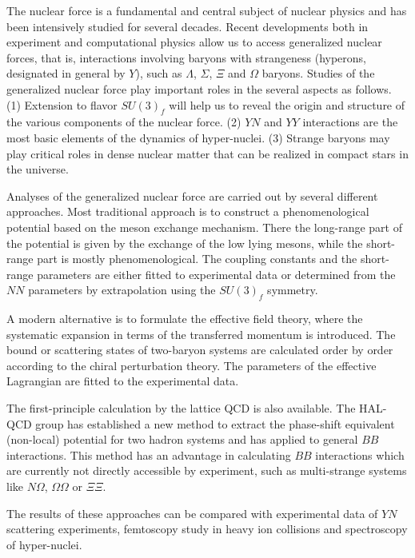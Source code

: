\documentclass[aps,prd,showpacs,floatfix,reprint,nofootinbib]{revtex4-1}
\begin{document}
The nuclear force is a fundamental and central subject of nuclear physics and has been intensively studied for several decades.
Recent developments both in experiment and computational physics allow us to access generalized 
nuclear forces, that is, interactions involving baryons with strangeness (hyperons, designated in general by $Y$), 
such as $\Lambda$, $\Sigma$, $\Xi$ and
$\Omega$ baryons. Studies of the generalized nuclear force play important roles in the several aspects as follows. 
(1) Extension to flavor $SU(3)_f$ will help us to reveal the origin and structure of the various components of the nuclear force\cite{Oka:1986fr,generalized-nuclear-force}.
(2) $YN$ and $YY$ interactions are the most basic elements of the dynamics of hyper-nuclei\cite{hypernuclear physics,Hiyama-Nakazawa}.
(3) Strange baryons may play critical roles in dense nuclear matter that can be realized in compact stars in the universe\cite{neutronstar}.

Analyses of the generalized nuclear force are carried out by several different approaches.  
Most traditional approach is to construct a phenomenological potential based 
on the meson exchange mechanism\cite{Julich model,Nijmegen model}. 
There the long-range part of the potential is given by the exchange of the low lying mesons,
while the short-range part is mostly phenomenological. The coupling constants and the short-range
parameters are either fitted to experimental data or determined from the $NN$ parameters by
extrapolation using the $SU(3)_f$ symmetry.

A modern alternative is to formulate the effective field theory\cite{chiral EFT}, where the systematic expansion in terms of
the transferred momentum is introduced. The bound or scattering states of two-baryon systems are 
calculated order by order according to the chiral perturbation theory. 
The parameters of the effective Lagrangian are fitted to the experimental data.

The first-principle calculation by the lattice QCD is also available. 
The HAL-QCD group has established 
a new method to extract the phase-shift equivalent (non-local) potential for two hadron systems
and has applied to general $BB$ interactions\cite{HALQCD}.
This method has an advantage in calculating $BB$ interactions
which are currently not directly accessible by experiment, 
such as multi-strange systems like $N\Omega$, $\Omega\Omega$ or $\Xi\Xi$\cite{exotic-HALQCD}.

The results of these approaches can be compared with experimental data of 
$YN$ scattering experiments\cite{YNexp}, femtoscopy study in heavy ion collisions\cite{Femtoscopy} and 
spectroscopy of hyper-nuclei\cite{hypernuclear physics,Hiyama-Nakazawa}.
 
\end{document}
